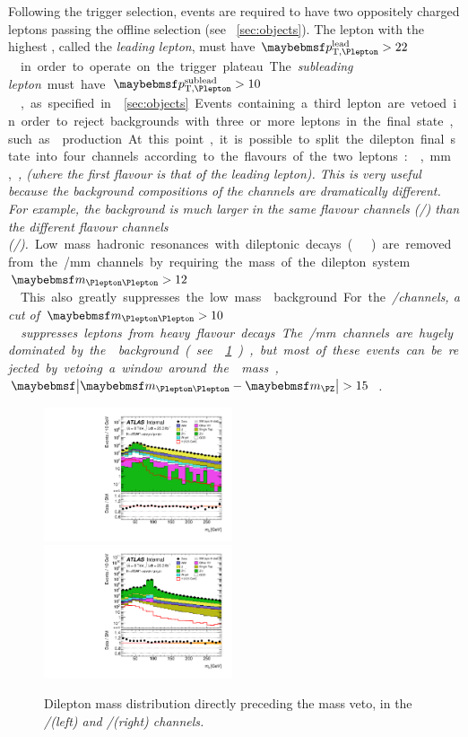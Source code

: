 Following the trigger selection, events are required to have two oppositely charged 
leptons passing the offline selection (see \Section~\ref{sec:objects}). The lepton with 
the highest \pt, called the \textit{leading lepton}, must have 
\unit{$\ptleadlep > 22$}{\GeV} in order to operate on the trigger plateau. The 
\textit{subleading lepton} must have \unit{$\ptsubleadlep > 10$}{\GeV}, as specified in 
\Section~\ref{sec:objects}. Events containing a third lepton are vetoed in order to 
reject backgrounds with three or more leptons in the final state, such as \WZ production.

At this point, it is possible to split the dilepton final state into four channels 
according to the flavours of the two leptons: \ee, \mm, \em, \me (where the first flavour 
is that of the leading lepton). This is very useful because the background compositions 
of the channels are dramatically different. For example, the \DY background is much 
larger in the same flavour channels (\ee/\mm) than the different flavour channels 
(\em/\me).

Low mass hadronic resonances with dileptonic decays (\eg \PJpsi) are removed from the 
\ee/\mm channels by requiring the mass of the dilepton system \unit{$\mll > 12$}{\GeV}. 
This also greatly suppresses the low mass \DY background. For the \em/\me channels, 
a cut of \unit{$\mll > 10$}{\GeV} suppresses leptons from heavy flavour decays. The 
\ee/\mm channels are hugely dominated by the \DY background (see 
\Figure~\ref{fig:sel:mll}), but most of these events can be rejected by 
vetoing a window around the \PZ mass, \unit{$\mods{\mll - \mZ} > 15$}{\GeV}.

\begin{figure}
	\includegraphics[width=0.495\textwidth]{tex/selection/emme_CutMll_Mll_mh125_log}
	\hfill
	\includegraphics[width=0.495\textwidth]{tex/selection/eemm_CutMll_Mll_mh125_log}
	\caption{Dilepton mass distribution directly preceding the \PZ mass veto, in the 
	\em/\me (left) and \ee/\mm (right) channels.}
	\label{fig:sel:mll}
\end{figure}

